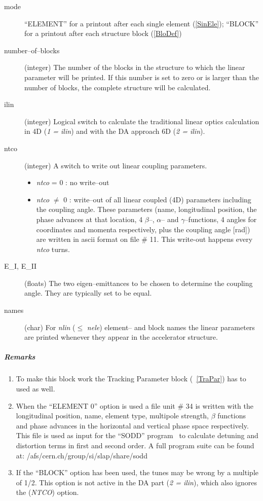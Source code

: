 \documentclass[a4paper,11pt]{report}
\begin{document}
\begin{description}
\item [mode] ``ELEMENT'' for a printout after each single element
  (\ref{SinEle}); ``BLOCK'' for a printout after each structure block
  (\ref{BloDef})
\item [number--of--blocks] (integer) The number of the blocks in the
  structure to which the linear parameter will be printed. If this
  number is set to zero or is larger than the number of blocks, the
  complete structure will be calculated.
\item [ilin] (integer) Logical switch to calculate the traditional
  linear optics calculation in 4D ({\it 1 = ilin}) and with the DA
  approach 6D ({\it 2 = ilin}).
\item [ntco] (integer) A switch to write out linear coupling
  parameters.
 \begin{itemize}
 \item {\em ntco} \/= 0 : no write--out
 \item {\em ntco} \/$\neq$ 0 : write--out of all linear coupled (4D)
   parameters including the coupling angle.  These parameters (name,
   longitudinal position, the phase advances at that location, 4
   $\beta$--, $\alpha$-- and $\gamma$--functions, 4 angles for
   coordinates and momenta respectively, plus the coupling angle
   [rad]) are written in ascii format on file \# 11.
   This write-out happens every \emph{ntco} turns.
 \end{itemize}
\item [E\_I, E\_II] (floats) The two eigen--emittances to be chosen to
  determine the coupling angle. They are typically set to be equal.
\item [names] (char) For {\em nlin} \/($\leq $ {\em nele}\/) element--
  and block names the linear parameters are printed whenever they
  appear in the accelerator structure.
\end{description}

\subparagraph{Remarks}
\begin{enumerate}
\item To make this block work the Tracking Parameter block
  (~\ref{TraPar}) has to used as well.
\item When the ``ELEMENT 0'' option is used a file unit \# 34 is
  written with the longitudinal position, name, element type,
  multipole strength, $\beta$ functions and phase advances in the
  horizontal and vertical phase space respectively. This file is used
  as input for the ``SODD'' program~\cite{SODD} to calculate detuning
  and distortion terms in first and second order. A full program suite
  can be found at: /afs/cern.ch/group/si/slap/share/sodd
\item If the ``BLOCK'' option has been used, the tunes may be wrong by
  a multiple of 1/2. This option is not active in the DA part ({\it 2
    = ilin}), which also ignores the ({\it NTCO}) option.
\end{enumerate}
\end{document}
